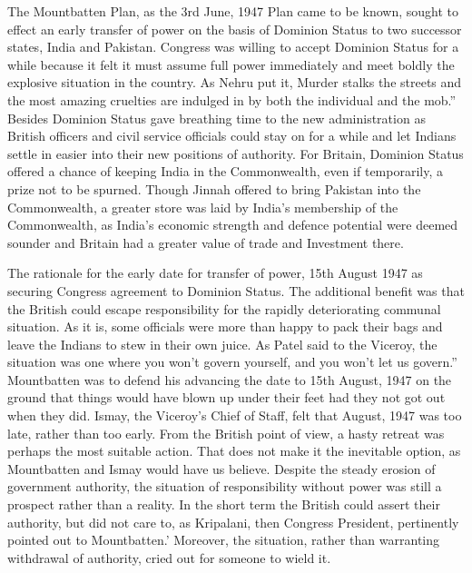 The Mountbatten Plan, as the 3rd June, 1947 Plan came to be known, sought to effect an early transfer of power on the basis of Dominion Status to two successor states, India and Pakistan. Congress was willing to accept Dominion Status for a while because it felt it must assume full power immediately and meet boldly the explosive situation in the country. As Nehru put it, Murder stalks the streets and the most amazing cruelties are indulged in by both the individual and the mob.'' Besides Dominion Status gave breathing time to the new administration as British officers and civil service officials could stay on for a while and let Indians settle in easier into their new positions of authority. For Britain, Dominion Status offered a chance of keeping India in the Commonwealth, even if temporarily, a prize not to be spurned. Though Jinnah offered to bring Pakistan into the Commonwealth, a greater store was laid by India's membership of the Commonwealth, as India's economic strength and defence potential were deemed sounder and Britain had a greater value of trade and Investment there. 

The rationale for the early date for transfer of power, 15th August 1947 as securing Congress agreement to Dominion Status. The additional benefit was that the British could escape responsibility for the rapidly deteriorating communal situation. As it is, some officials were more than happy to pack their bags and leave the Indians to stew in their own juice. As Patel said to the Viceroy, the situation was one where you won't govern yourself, and you won't let us govern.'' Mountbatten was to defend his advancing the date to 15th August, 1947 on the ground that things would have blown up under their feet had they not got out when they did. Ismay, the Viceroy's Chief of Staff, felt that August, 1947 was too late, rather than too early. From the British point of view, a hasty retreat was perhaps the most suitable action. That does not make it the inevitable option, as Mountbatten and Ismay would have us believe. Despite the steady erosion of government authority, the situation of responsibility without power was still a prospect rather than a reality. In the short term the British could assert their authority, but did not care to, as Kripalani, then Congress President, pertinently pointed out to Mountbatten.' Moreover, the situation, rather than warranting withdrawal of authority, cried out for someone to wield it. 

